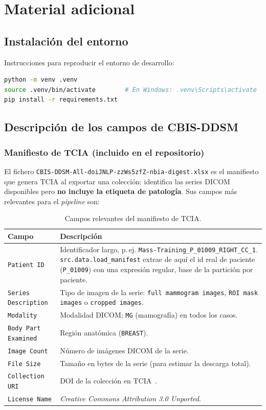 \chapter{Material adicional}
\label{ap:material}

\section{Instalación del entorno}
Instrucciones para reproducir el entorno de desarrollo:
\begin{lstlisting}[language=bash, numbers=none]
python -m venv .venv
source .venv/bin/activate        # En Windows: .venv\Scripts\activate
pip install -r requirements.txt
\end{lstlisting}

\section{Descripción de los campos de CBIS-DDSM}

\subsection{Manifiesto de TCIA (incluido en el repositorio)}
El fichero \texttt{CBIS-DDSM-All-doiJNLP-zzWs5zfZ-nbia-digest.xlsx} es el
manifiesto que genera TCIA al exportar una colección: identifica las series
DICOM disponibles pero \textbf{no incluye la etiqueta de patología}. Sus
campos más relevantes para el \textit{pipeline} son:

\begin{table}[H]
\centering
\caption{Campos relevantes del manifiesto de TCIA.}
\label{tab:campos-manifiesto}
\begin{tabular}{@{}p{3.2cm}p{11cm}@{}}
\toprule
\textbf{Campo} & \textbf{Descripción} \\
\midrule
\texttt{Patient ID} & Identificador largo, p.\,ej.
  \texttt{Mass-Training\_P\_01009\_RIGHT\_CC\_1}. \texttt{src.data.load\_manifest}
  extrae de aquí el id real de paciente (\texttt{P\_01009}) con una expresión
  regular, base de la partición por paciente. \\
\texttt{Series Description} & Tipo de imagen de la serie: \texttt{full mammogram
  images}, \texttt{ROI mask images} o \texttt{cropped images}. \\
\texttt{Modality} & Modalidad DICOM; \texttt{MG} (mamografía) en todos los casos. \\
\texttt{Body Part Examined} & Región anatómica (\texttt{BREAST}). \\
\texttt{Image Count} & Número de imágenes DICOM de la serie. \\
\texttt{File Size} & Tamaño en bytes de la serie (para estimar la descarga total). \\
\texttt{Collection URI} & DOI de la colección en TCIA~\cite{lee2017cbisddsm}. \\
\texttt{License Name} & \textit{Creative Commons Attribution 3.0 Unported}. \\
\bottomrule
\end{tabular}
\end{table}


